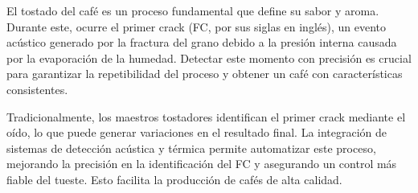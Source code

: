 \documentclass[
11pt, %
]{charter}
\begin{document}
El tostado del café es un proceso fundamental que define su sabor y aroma. Durante este, ocurre el primer crack (FC, por sus siglas en inglés), un evento acústico generado por la fractura del grano debido a la presión interna causada por la evaporación de la humedad. Detectar este momento con precisión es crucial para garantizar la repetibilidad del proceso y obtener un café con características consistentes.

Tradicionalmente, los maestros tostadores identifican el primer crack mediante el oído, lo que puede generar variaciones en el resultado final. La integración de sistemas de detección acústica y térmica permite automatizar este proceso, mejorando la precisión en la identificación del FC y asegurando un control más fiable del tueste. Esto facilita la producción de cafés de alta calidad.
\end{document}
